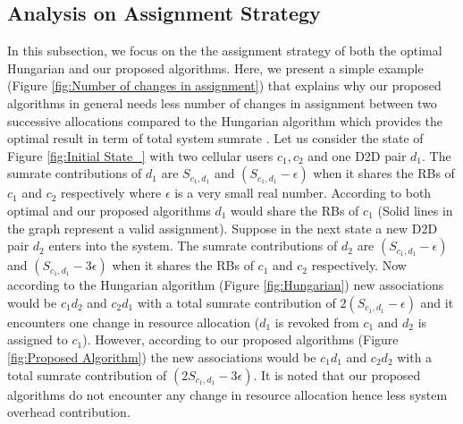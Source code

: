\documentclass[times]{dacauth}
\begin{document}
\subsection{Analysis on Assignment Strategy}\label{assighment stragegy}
\smallskip
\noindent 
In this subsection, we focus on the the assignment strategy of both the optimal Hungarian and our proposed algorithms. Here, we present a simple example  (Figure \ref{fig:Number of changes in assignment}) that explains why our proposed algorithms in general needs less number of changes in assignment between two successive allocations compared to the Hungarian algorithm which provides the optimal result in term of total system sumrate \cite{ccnc}. Let us consider the state of Figure \ref{fig:Initial State_} with two cellular users $ c_{1}, c_{2}$  and one D2D pair $d_{1}$. The sumrate contributions of $d_{1}$ are $S_{c_1,d_1}$ and $(S_{c_1, d_1}-\epsilon)$ when it shares the RBs of $ c_{1}$ and $ c_{2}$ respectively where $\epsilon$ is a very small real number. According to both optimal and our proposed algorithms $d_{1}$ would share the RBs of $c_{1}$ (Solid lines in the graph represent a valid assignment). Suppose in the next state a new D2D pair $d_{2}$ enters into the system. The sumrate contributions of $d_{2}$ are $(S_{c_1, d_1}-\epsilon)$ and $(S_{c_1, d_1}-3\epsilon)$ when it shares the RBs of $ c_{1}$ and $ c_{2}$ respectively. Now according to the Hungarian algorithm (Figure \ref{fig:Hungarian}) new associations would be $c_1d_2$ and $c_2d_1$ with a total sumrate contribution of $2(S_{c_1, d_1}-\epsilon)$ and it encounters one change in resource allocation ($d_{1}$ is revoked from $c_{1}$ and $d_{2}$ is assigned to $c_{1}$). However, according to our proposed algorithms (Figure \ref{fig:Proposed Algorithm}) the new associations would be $c_1d_1$ and $c_2d_2$ with a total sumrate contribution of $(2S_{c_1, d_1}-3\epsilon)$. It is noted that our proposed algorithms do not encounter any change in resource allocation hence less system overhead contribution.
\end{document}

